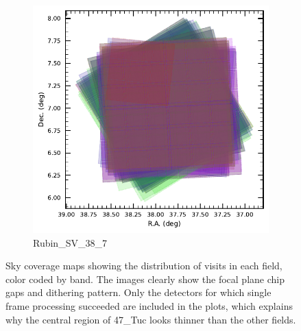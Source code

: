 \begin{figure}[ht]
    \begin{subfigure}[b]{0.22\textwidth}
        \centering
        \includegraphics[width=\linewidth]{showVisit_DP1_RubinSV_38_7}
        \caption{Rubin\_SV\_38\_7}
    \end{subfigure}\hfill
    \begin{subfigure}[b]{0.22\textwidth}
        \caption*{}
    \end{subfigure}
     \vspace{1em}
    \caption{Sky coverage maps showing the distribution of visits in each field, color coded by band. The images clearly show the focal plane chip gaps and dithering pattern. Only the detectors for which single frame processing succeeded are included in the plots, which explains why the central region of 47\_Tuc looks thinner than the other fields. }
    \label{fig:dp1_fields_coverage}
\end{figure}


